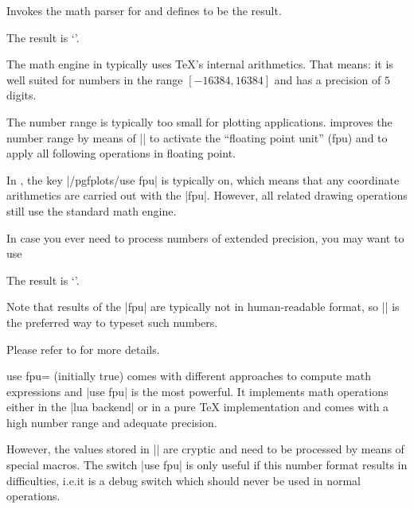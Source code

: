 \begin{command}{\pgfmathparse{}}
    Invokes the \pgfname{} math parser for  and defines
    \declareandlabel{\pgfmathresult} to be the result.
\begin{codeexample}[]

The result is `\pgfmathresult'.
\end{codeexample}
    \noindent The math engine in \pgfname{} typically uses \TeX's internal
    arithmetics. That means: it is well suited for numbers in the range
    $[-16384,16384]$ and has a precision of $5$ digits.

    The number range is typically too small for plotting applications.
    \PGFPlots{} improves the number range by means of
    || to activate the ``floating point
    unit'' (fpu) and to apply all following operations in floating point.

    In \PGFPlots{}, the key |/pgfplots/use fpu| is typically on, which means
    that any coordinate arithmetics are carried out with the |fpu|. However,
    all \pgfname{} related drawing operations still use the standard math
    engine.

    In case you ever need to process numbers of extended precision, you may
    want to use
\begin{codeexample}[]
%

The result is `\pgfmathprintnumber{\pgfmathresult}'.
\end{codeexample}
    Note that results of the |fpu| are typically not in human-readable format,
    so |\pgfmathprintnumber| is the preferred way to typeset such numbers.

    Please refer to \cite{tikz} for more details.
\end{command}

\begin{pgfplotskey}{use fpu= (initially true)}
    \PGFPlots{} comes with different approaches to compute math expressions and
    |use fpu| is the most powerful. It implements math operations either in the
    |lua backend| or in a pure \TeX{} implementation and comes with a high
    number range and adequate precision.

    However, the values stored in |\pgfmathresult| are cryptic and need to be
    processed by means of special macros. The switch |use fpu| is only useful
    if this number format results in difficulties, i.e.\@ it is a debug switch
    which should never be used in normal operations.
\end{pgfplotskey}


